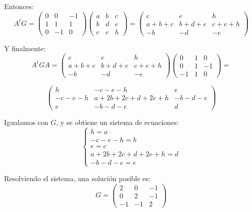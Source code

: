 \documentclass[12pt]{article}
\begin{document}
\begin{ejercicio}[4 puntos]
\begin{enumerate}
			Entonces:
			\[
			A^t G = \begin{pmatrix}
				0 & 0 & -1 \\
				1 & 1 & 1 \\
				0 & -1 & 0
			\end{pmatrix}
			\begin{pmatrix}
				a & b & c \\
				b & d & e \\
				c & e & h
			\end{pmatrix}
			= \begin{pmatrix}
				c & e & h \\
				a + b + c & b + d + e & c + e + h \\
				-b & -d & -e
			\end{pmatrix}
			\]
			
			Y finalmente:
			\[
			A^t G A = \begin{pmatrix}
				c & e & h \\
				a + b + c & b + d + e & c + e + h \\
				-b & -d & -e
			\end{pmatrix}
			\begin{pmatrix}
				0 & 1 & 0 \\
				0 & 1 & -1 \\
				-1 & 1 & 0
			\end{pmatrix}
			 =
			 \]
			 
			 \[
			\begin{pmatrix}
				h & -c - e - h & e \\
				-c - e - h & a + 2b + 2c + d + 2e + h & -b - d - e \\
				e & -b - d - e & d
			\end{pmatrix}
			\]
			
			Igualamos con \( G \), y se obtiene un sistema de ecuaciones:
			\[
			\begin{cases}
				h = a \\
				-c - e - h = b \\
				e = c \\
				a + 2b + 2c + d + 2e + h = d \\
				-b - d - e = e 
			\end{cases}
			\]
			
			Resolviendo el sistema, una solución posible es:
			\[
			G = \begin{pmatrix} 2 & 0 & -1 \\ 0 & 2 & -1 \\ -1 & -1 & 2 \end{pmatrix}
			\]
			

\end{enumerate}
\end{ejercicio}
\end{document}
